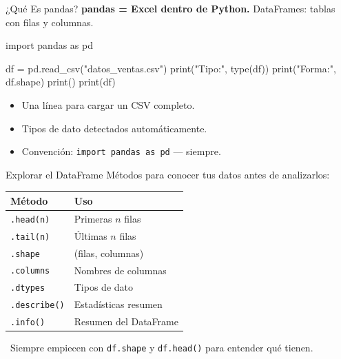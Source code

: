 \documentclass[aspectratio=169, 11pt]{beamer}
\begin{document}
\begin{frame}[fragile,shrink=28]{¿Qué Es pandas?}
  \vspace{-6pt}
  {\footnotesize
    \textbf{pandas = Excel dentro de Python.}
    DataFrames: tablas con filas y columnas.}

  \vspace{4pt}
  \begin{pyblock}
import pandas as pd

df = pd.read_csv("datos_ventas.csv")
print("Tipo:", type(df))
print("Forma:", df.shape)
print()
print(df)
  \end{pyblock}

  \vspace{4pt}
  {\scriptsize\color{textMuted}
  \begin{itemize}\setlength{\itemsep}{3pt}
    \item[{\color{arcaRed}\scriptsize\faArrowRight}]
      Una línea para cargar un CSV completo.
    \item[{\color{arcaRed}\scriptsize\faArrowRight}]
      Tipos de dato detectados automáticamente.
    \item[{\color{arcaRed}\scriptsize\faLightbulb}]
      Convención: \texttt{import pandas as pd} --- siempre.
  \end{itemize}
  }
\end{frame}

\begin{frame}{Explorar el DataFrame}
  \vspace{-4pt}
  {\footnotesize
    Métodos para conocer tus datos antes de analizarlos:}

  \vspace{8pt}
  {\small
  \begin{tabular}{@{}ll@{}}
    \toprule
    \textbf{Método} & \textbf{Uso} \\
    \midrule
    \texttt{.head(n)}    & Primeras $n$ filas \\
    \texttt{.tail(n)}    & Últimas $n$ filas \\
    \texttt{.shape}      & (filas, columnas) \\
    \texttt{.columns}    & Nombres de columnas \\
    \texttt{.dtypes}     & Tipos de dato \\
    \texttt{.describe()} & Estadísticas resumen \\
    \texttt{.info()}     & Resumen del DataFrame \\
    \bottomrule
  \end{tabular}
  }

  \vspace{8pt}
  {\scriptsize\color{textMuted}
    \faLightbulb\ Siempre empiecen con
    \texttt{df.shape} y \texttt{df.head()}
    para entender qué tienen.}
\end{frame}
\end{document}
